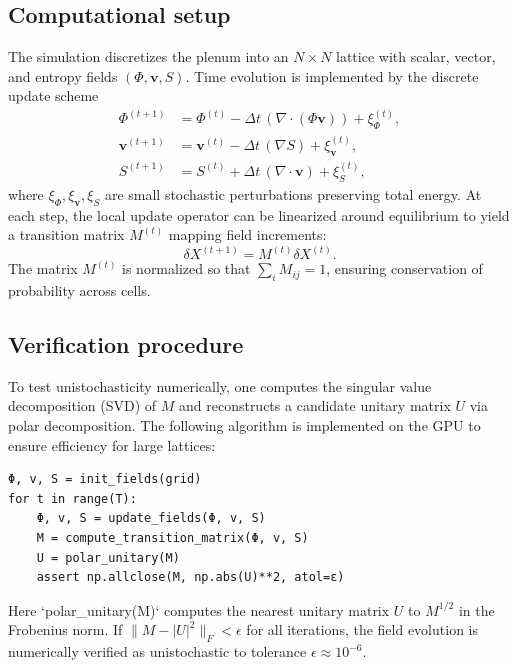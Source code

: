 \documentclass[12pt,a4paper]{article}
\theoremstyle{plain}
\begin{document}
\subsection{Computational setup}
The simulation discretizes the plenum into an \(N\times N\) lattice with scalar, vector, and entropy fields \((\Phi,\mathbf{v},S)\).  
Time evolution is implemented by the discrete update scheme
\begin{align}
\Phi^{(t+1)} &= \Phi^{(t)} - \Delta t\,(\nabla\!\cdot\!(\Phi\mathbf{v})) + \xi_\Phi^{(t)}, \\
\mathbf{v}^{(t+1)} &= \mathbf{v}^{(t)} - \Delta t\,(\nabla S) + \xi_\mathbf{v}^{(t)},\\
S^{(t+1)} &= S^{(t)} + \Delta t\,(\nabla\!\cdot\!\mathbf{v}) + \xi_S^{(t)},
\end{align}
where \(\xi_\Phi,\xi_\mathbf{v},\xi_S\) are small stochastic perturbations preserving total energy.
At each step, the local update operator can be linearized around equilibrium to yield a transition matrix \(M^{(t)}\) mapping field increments:
\[
\delta X^{(t+1)} = M^{(t)} \delta X^{(t)}.
\]
The matrix \(M^{(t)}\) is normalized so that \(\sum_i M_{ij}=1\), ensuring conservation of probability across cells.

\subsection{Verification procedure}
To test unistochasticity numerically, one computes the singular value decomposition (SVD) of \(M\) and reconstructs a candidate unitary matrix \(U\) via polar decomposition.  
The following algorithm is implemented on the GPU to ensure efficiency for large lattices:

\begin{verbatim}
Φ, v, S = init_fields(grid)
for t in range(T):
    Φ, v, S = update_fields(Φ, v, S)
    M = compute_transition_matrix(Φ, v, S)
    U = polar_unitary(M)
    assert np.allclose(M, np.abs(U)**2, atol=ε)
\end{verbatim}

Here `polar_unitary(M)` computes the nearest unitary matrix \(U\) to \(M^{1/2}\) in the Frobenius norm.  
If \(\|M - |U|^2\|_F < \epsilon\) for all iterations, the field evolution is numerically verified as unistochastic to tolerance \(\epsilon \approx 10^{-6}\).
\end{document}
